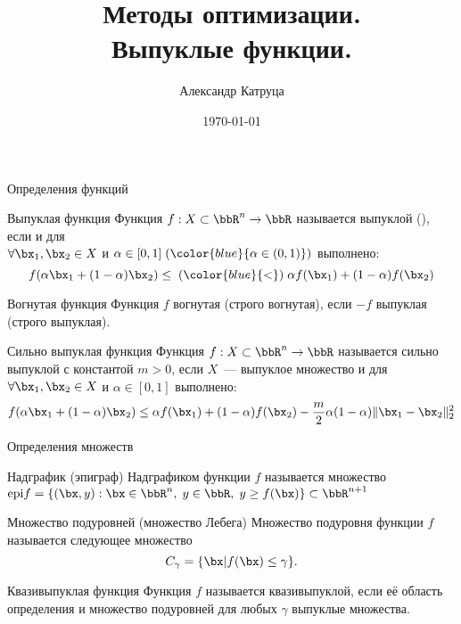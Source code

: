\documentclass[12pt]{beamer}
\title[Выпуклые функции]{Методы оптимизации. \\
 Выпуклые функции.}
\author{Александр Катруца}
\institute{Московский физико-технический институт}
\date{\today}
\begin{document}
\begin{frame}
\maketitle
\end{frame}

\begin{frame}{Определения функций}
\small
\begin{block}{Выпуклая функция}
Функция $f: X \subset \bbR^n \rightarrow \bbR$ называется выпуклой ({\color{blue}{строго выпуклой}}), если {\color{red}{$X$~--- выпуклое множество}} и для \\ 
$\forall \bx_1, \bx_2 \in X$ и $\alpha \in [0, 1] \; ({\color{blue}{\alpha \in (0, 1)}})$  выполнено:
\vspace{-4mm}
\[
f(\alpha \bx_1 + (1 - \alpha)\bx_2) \leq \; ({\color{blue}{<}}) \; \alpha f(\bx_1) + (1 - \alpha)f(\bx_2)
\]
\end{block}

\begin{block}{Вогнутая функция}
Функция $f$ вогнутая (строго вогнутая), если $-f$ выпуклая (строго выпуклая).
\end{block}

\begin{block}{Сильно выпуклая функция}
Функция $f: X \subset \bbR^n \rightarrow \bbR$ называется сильно  выпуклой с константой $m > 0$, если $X$~--- выпуклое множество и для $\forall \bx_1, \bx_2 \in X$ и $\alpha \in [0, 1]$  выполнено:
\vspace{-4mm}
\[
f(\alpha \bx_1 + (1 - \alpha)\bx_2) \leq \alpha f(\bx_1) + (1 - \alpha)f(\bx_2) - \frac{m}{2} \alpha (1 - \alpha) \| \bx_1 - \bx_2 \|_2^2
\]
\end{block}

\end{frame}

\begin{frame}{Определения множеств}
\begin{block}{Надграфик (эпиграф)}
Надграфиком функции $f$ называется множество $\text{epi}f = \{ (\bx, y) : \bx \in \bbR^n, \; y \in \bbR, \; y \geq f(\bx) \} \subset \bbR^{n+1}$
\end{block}

\begin{block}{Множество подуровней (множество Лебега)}
Множество подуровня функции $f$ называется следующее множество
\vspace{-4mm}
\[
C_{\gamma} = \{ \bx | f(\bx) \leq \gamma \}.
\]
\end{block}

\begin{block}{Квазивыпуклая функция}
Функция $f$ называется квазивыпуклой, если её область определения и множество подуровней для любых $\gamma$ выпуклые множества. 
\end{block}
\end{frame}
\end{document}
